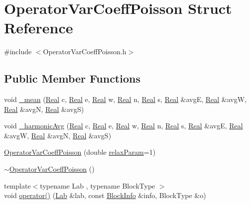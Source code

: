 \hypertarget{struct_operator_var_coeff_poisson}{}\section{Operator\+Var\+Coeff\+Poisson Struct Reference}
\label{struct_operator_var_coeff_poisson}


{\ttfamily \#include $<$Operator\+Var\+Coeff\+Poisson.\+h$>$}

\subsection*{Public Member Functions}
\begin{DoxyCompactItemize}
\item 
void \hyperlink{struct_operator_var_coeff_poisson_a1798d9301aa640c6b23ab6109d7015d7}{\+\_\+mean} (\hyperlink{_h_d_f5_dumper_8h_a445a5f0e2a34c9d97d69a3c2d1957907}{Real} c, \hyperlink{_h_d_f5_dumper_8h_a445a5f0e2a34c9d97d69a3c2d1957907}{Real} e, \hyperlink{_h_d_f5_dumper_8h_a445a5f0e2a34c9d97d69a3c2d1957907}{Real} w, \hyperlink{_h_d_f5_dumper_8h_a445a5f0e2a34c9d97d69a3c2d1957907}{Real} n, \hyperlink{_h_d_f5_dumper_8h_a445a5f0e2a34c9d97d69a3c2d1957907}{Real} s, \hyperlink{_h_d_f5_dumper_8h_a445a5f0e2a34c9d97d69a3c2d1957907}{Real} \&avg\+E, \hyperlink{_h_d_f5_dumper_8h_a445a5f0e2a34c9d97d69a3c2d1957907}{Real} \&avg\+W, \hyperlink{_h_d_f5_dumper_8h_a445a5f0e2a34c9d97d69a3c2d1957907}{Real} \&avg\+N, \hyperlink{_h_d_f5_dumper_8h_a445a5f0e2a34c9d97d69a3c2d1957907}{Real} \&avg\+S)
\item 
void \hyperlink{struct_operator_var_coeff_poisson_ad8db19c493993f68b4b9c77e8da65b39}{\+\_\+harmonic\+Avg} (\hyperlink{_h_d_f5_dumper_8h_a445a5f0e2a34c9d97d69a3c2d1957907}{Real} c, \hyperlink{_h_d_f5_dumper_8h_a445a5f0e2a34c9d97d69a3c2d1957907}{Real} e, \hyperlink{_h_d_f5_dumper_8h_a445a5f0e2a34c9d97d69a3c2d1957907}{Real} w, \hyperlink{_h_d_f5_dumper_8h_a445a5f0e2a34c9d97d69a3c2d1957907}{Real} n, \hyperlink{_h_d_f5_dumper_8h_a445a5f0e2a34c9d97d69a3c2d1957907}{Real} s, \hyperlink{_h_d_f5_dumper_8h_a445a5f0e2a34c9d97d69a3c2d1957907}{Real} \&avg\+E, \hyperlink{_h_d_f5_dumper_8h_a445a5f0e2a34c9d97d69a3c2d1957907}{Real} \&avg\+W, \hyperlink{_h_d_f5_dumper_8h_a445a5f0e2a34c9d97d69a3c2d1957907}{Real} \&avg\+N, \hyperlink{_h_d_f5_dumper_8h_a445a5f0e2a34c9d97d69a3c2d1957907}{Real} \&avg\+S)
\item 
\hyperlink{struct_operator_var_coeff_poisson_ad57e656e15af3c5ca01a0d7611fabaa8}{Operator\+Var\+Coeff\+Poisson} (double \hyperlink{struct_operator_var_coeff_poisson_acdb83c08518796d752d5d4ea6440da78}{relax\+Param}=1)
\item 
\hyperlink{struct_operator_var_coeff_poisson_ace62515a1970d5b2cb06810c04fee5e8}{$\sim$\+Operator\+Var\+Coeff\+Poisson} ()
\item 
{\footnotesize template$<$typename Lab , typename Block\+Type $>$ }\\void \hyperlink{struct_operator_var_coeff_poisson_a5a65a7228eb641f33c5b3ae140963bcd}{operator()} (\hyperlink{_definitions_8h_ad6f951af9a2a6ebc1975404882b34314}{Lab} \&lab, const \hyperlink{struct_block_info}{Block\+Info} \&info, Block\+Type \&o)
\end{DoxyCompactItemize}

